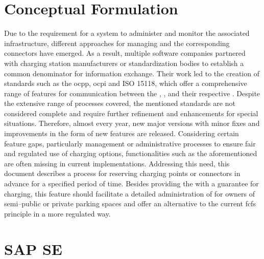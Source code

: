 \section{Conceptual Formulation}
\label{ch:Introduction:sec:Conceptual Formulation}

Due to the requirement for a system to administer and monitor the associated infrastructure, different approaches for managing  and the corresponding connectors have emerged.
As a result, multiple software companies partnered with charging station manufacturers or standardization bodies to establish a common denominator for information exchange.
Their work led to the creation of standards such as the \acrfull{ocpp}, \acrfull{ocpi} and ISO 15118, which offer a comprehensive range of features for communication between the , , and their respective .
Despite the extensive range of processes covered, the mentioned standards are not considered complete and require further refinement and enhancements for special situations.
Therefore, almost every year, new major versions with minor fixes and improvements in the form of new features are released. 
Considering certain feature gaps, particularly management or administrative processes to ensure fair and regulated use of charging options, functionalities such as the aforementioned are often missing in current implementations. 
Addressing this need, this document describes a process for reserving charging points or connectors in advance for a specified period of time.
Besides providing the  with a guarantee for charging, this feature should facilitate a detailed administration of  for owners of semi--public or private parking spaces and offer an alternative to the current \acrfull{fcfs} principle in a more regulated way.

\section{SAP SE}
\label{ch:Introduction:sec:SAP SE}

